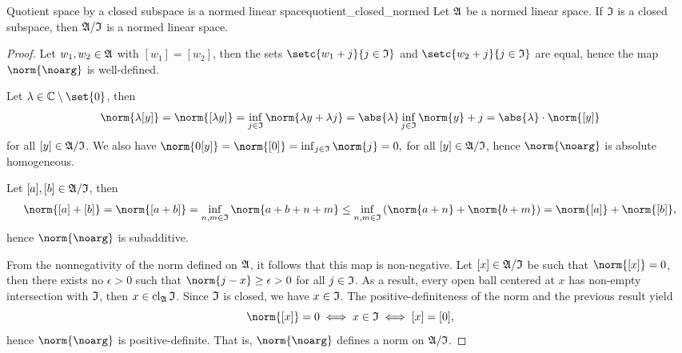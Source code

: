 \begin{lemma}{Quotient space by a closed subspace is a normed linear space}{quotient_closed_normed}
    Let \(\mathfrak{A}\) be a normed linear space. If \(\mathfrak{I}\) is a closed subspace, then \(\mathfrak{A}/\mathfrak{I}\) is a normed linear space.
\end{lemma}
\begin{proof}
    Let \(w_1, w_2 \in \mathfrak{A}\) with \([w_1] = [w_2]\), then the sets \(\setc{w_1 + j}{j \in \algebra{I}}\) and \(\setc{w_2 + j}{j \in \algebra{I}}\) are equal, hence the map \(\norm{\noarg}\) is well-defined.

    Let \(\lambda \in \mathbb{C}\setminus\set{0}\), then
    \begin{equation*}
        \norm{\lambda [y]} = \norm{[\lambda y]} = \inf_{j \in \algebra{I}}{\norm{\lambda y + \lambda j}}= \abs{\lambda} \inf_{j \in \algebra{I}}{\norm{y} + j} = \abs{\lambda}\cdot \norm{[y]}
    \end{equation*}
    for all \([y] \in \mathfrak{A}/\mathfrak{I}\). We also have \(\norm{0 [y]} = \norm{[0]} = \inf_{j \in \algebra{I}} \norm{j} = 0,\) for all \([y] \in \mathfrak{A}/\mathfrak{I}\), hence \(\norm{\noarg}\) is absolute homogeneous.

    Let \([a], [b] \in \mathfrak{A}/\mathfrak{I}\), then
    \begin{equation*}
        \norm{[a] + [b]} = \norm{[a+b]} = \inf_{n,m \in \algebra{I}}{\norm{a+b+n+m}} \leq \inf_{n,m \in \algebra{I}}{\left(\norm{a + n} + \norm{b+m}\right)} = \norm{[a]} + \norm{[b]},
    \end{equation*}
    hence \(\norm{\noarg}\) is subadditive.

    From the nonnegativity of the norm defined on \(\mathfrak{A}\), it follows that this map is non-negative. Let \([x] \in \mathfrak{A}/\mathfrak{I}\) be such that \(\norm{[x]} = 0\), then there exists no \(\epsilon > 0\) such that \(\norm{j - x} \geq \epsilon > 0\) for all \(j \in \mathfrak{I}\). As a result, every open ball centered at \(x\) has non-empty intersection with \(\mathfrak{I}\), then \(x \in \operatorname{cl}_{\mathfrak{A}}\mathfrak{I}\). Since \(\mathfrak{I}\) is closed, we have \(x \in \mathfrak{I}\). The positive-definiteness of the norm and the previous result yield
    \begin{equation*}
        \norm{[x]} = 0 \iff x \in \algebra{I} \iff [x] = [0],
    \end{equation*}
    hence \(\norm{\noarg}\) is positive-definite. That is, \(\norm{\noarg}\) defines a norm on \(\mathfrak{A}/\mathfrak{I}\).
\end{proof}
